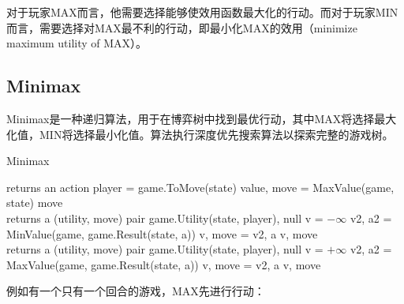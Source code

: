 对于玩家MAX而言，他需要选择能够使效用函数最大化的行动。而对于玩家MIN而言，需要选择对MAX最不利的行动，即最小化MAX的效用（minimize maximum utility of MAX）。\\

\subsection{Minimax}

Minimax是一种递归算法，用于在博弈树中找到最优行动，其中MAX将选择最大化值，MIN将选择最小化值。算法执行深度优先搜索算法以探索完整的游戏树。\\

\begin{algorithm}[H]
    \caption{Minimax}
    \begin{algorithmic}[1]
         returns an action
        \State player = game.ToMove(state)
        \State value, move = MaxValue(game, state)
        \State \Return move
        \EndProcedure
        \\
         returns a (utility, move) pair
        \State \Return game.Utility(state, player), null
        \EndIf
        \State v = $ - \infty $
        \State v2, a2 = MinValue(game, game.Result(state, a))
        \State v, move = v2, a
        \EndIf
        \EndFor
        \State \Return v, move
        \EndProcedure
        \\
         returns a (utility, move) pair
        \State \Return game.Utility(state, player), null
        \EndIf
        \State v = $ + \infty $
        \State v2, a2 = MaxValue(game, game.Result(state, a))
        \State v, move = v2, a
        \EndIf
        \EndFor
        \State \Return v, move
        \EndProcedure
    \end{algorithmic}
\end{algorithm}

例如有一个只有一个回合的游戏，MAX先进行行动：

\begin{figure}[H]
    \centering
\end{figure}

